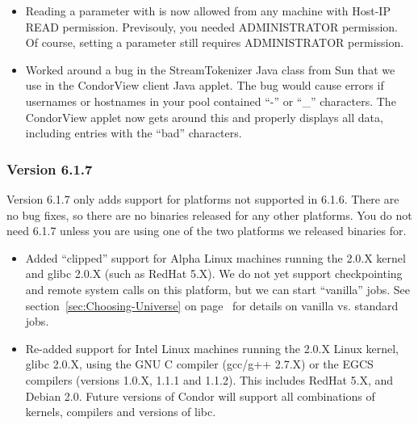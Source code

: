 \begin{itemize}
\item Reading a parameter with  is now allowed from any
machine with Host-IP READ permission.
Previsouly, you needed ADMINISTRATOR permission.  
Of course, setting a parameter still requires ADMINISTRATOR permission.

\item Worked around a bug in the StreamTokenizer Java class from Sun
that we use in the CondorView client Java applet.
The bug would cause errors if usernames or hostnames in your pool
contained ``-'' or ``\_'' characters.
The CondorView applet now gets around this and properly displays all
data, including entries with the ``bad'' characters.

\end{itemize}

\subsubsection{\label{sec:New-6-1-7}Version 6.1.7}

\Note Version 6.1.7 only adds support for platforms not supported in
6.1.6.  
There are no bug fixes, so there are no binaries released for any
other platforms. 
You do not need 6.1.7 unless you are using one of the two platforms we
released binaries for.

\begin{itemize}

\item Added ``clipped'' support for Alpha Linux machines running the
2.0.X kernel and glibc 2.0.X (such as RedHat 5.X).
We do not yet support checkpointing and remote system calls on this
platform, but we can start ``vanilla'' jobs.
See section~\ref{sec:Choosing-Universe} on
page~\pageref{sec:Choosing-Universe} for details on vanilla
vs. standard jobs.

\item Re-added support for Intel Linux machines running the 2.0.X
Linux kernel, glibc 2.0.X, using the GNU C compiler (gcc/g++ 2.7.X) or
the EGCS compilers (versions 1.0.X, 1.1.1 and 1.1.2).
This includes RedHat 5.X, and Debian 2.0.
Future versions of Condor will support all combinations of kernels,
compilers and versions of libc.

\end{itemize}


